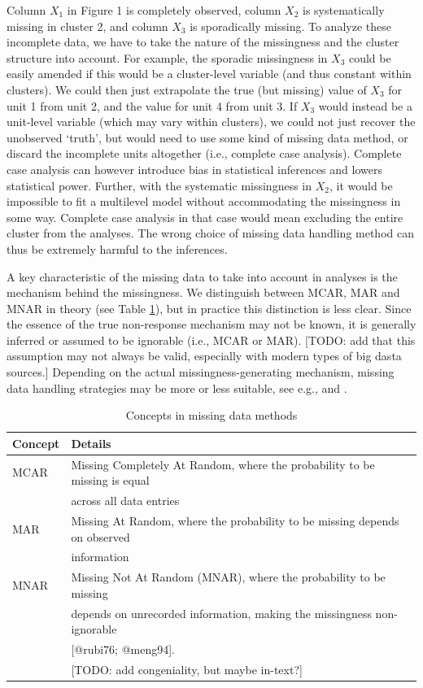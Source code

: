 \documentclass[
]{jss}
\begin{document}
Column \(X_1\) in Figure 1 is completely observed, column \(X_2\) is
systematically missing in cluster 2, and column \(X_3\) is sporadically
missing. To analyze these incomplete data, we have to take the nature of
the missingness and the cluster structure into account. For example, the
sporadic missingness in \(X_3\) could be easily amended if this would be
a cluster-level variable (and thus constant within clusters). We could
then just extrapolate the true (but missing) value of \(X_3\) for unit 1
from unit 2, and the value for unit 4 from unit 3. If \(X_3\) would
instead be a unit-level variable (which may vary within clusters), we
could not just recover the unobserved `truth', but would need to use
some kind of missing data method, or discard the incomplete units
altogether (i.e., complete case analysis). Complete case analysis can
however introduce bias in statistical inferences and lowers statistical
power. Further, with the systematic missingness in \(X_2\), it would be
impossible to fit a multilevel model without accommodating the
missingness in some way. Complete case analysis in that case would mean
excluding the entire cluster from the analyses. The wrong choice of
missing data handling method can thus be extremely harmful to the
inferences.

A key characteristic of the missing data to take into account in
analyses is the mechanism behind the missingness. We distinguish between
MCAR, MAR and MNAR in theory (see Table \ref{tab:miss}), but in practice
this distinction is less clear. Since the essence of the true
non-response mechanism may not be known, it is generally inferred or
assumed to be ignorable (i.e., MCAR or MAR). {[}TODO: add that this
assumption may not always be valid, especially with modern types of big
dasta sources.{]} Depending on the actual missingness-generating
mechanism, missing data handling strategies may be more or less
suitable, see e.g., \citet{yuce08} and \citet{hox15}.

\begin{table}[tb]
\caption{Concepts in missing data methods}
\label{tab:miss}
\centering
\begin{tabular}{ll}
\hline
\textbf{Concept} & \textbf{Details}   \\
\hline
MCAR    & Missing Completely At Random, where the probability to be missing is equal \\
& across all data entries \\
MAR     & Missing At Random, where the probability to be missing depends on observed \\
& information \\
MNAR    & Missing Not At Random (MNAR), where the probability to be missing \\
& depends on unrecorded information, making the missingness non-ignorable \\
& [@rubi76; @meng94]. \\
& [TODO: add congeniality, but maybe in-text?] \\
\hline
\end{tabular}
\end{table}
\end{document}
